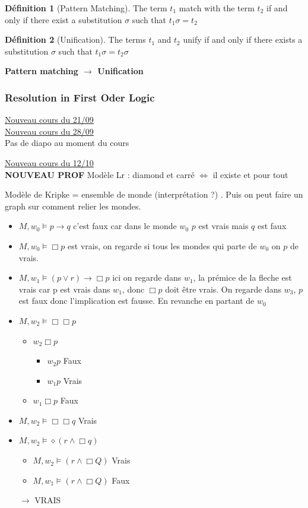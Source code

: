 \documentclass{article}
\theoremstyle{plain}%
\theoremstyle{definition}
\newtheorem{defn}{Définition}[section]
\theoremstyle{remark}
\begin{document}
\begin{defn}[Pattern Matching]
    The term $ t_1 $ match with the term $ t_2 $ if and only if there exist a substitution $ \sigma  $ such that $ t_1 \sigma = t_2 $ 
\end{defn}
\begin{defn}[Unification]
    The terms $ t_1 $ and $ t_2 $  unify if and only if there exists a substitution $ \sigma  $ such that $ t_1 \sigma = t_2 \sigma  $ 
\end{defn}
\textbf{Pattern matching $\rightarrow$ Unification}

\subsubsection{Resolution in First Oder Logic}

\underline{Nouveau cours du 21/09} \\
\underline{Nouveau cours du 28/09} \\
Pas de diapo au moment du cours

\underline{Nouveau cours du 12/10} \\
\textbf{NOUVEAU PROF}
Modèle Lr : diamond et carré $\Leftrightarrow$ il existe et pour tout 

Modèle de Kripke = ensemble de monde (interprétation ?) . Puis on peut faire un graph sur comment relier les mondes. \begin{itemize}
    \item $ M, w_0\models p \rightarrow q $ c'est faux car dans le monde $ w_0 $ $ p $ est vrais mais $ q $ est faux
    \item $ M, w_0\models \Box p $ est vrais, on regarde si tous les mondes qui parte de $ w_0 $ on $ p $ de vrais.
    \item $ M, w_1 \models (p \vee r) \rightarrow \Box p$ ici on regarde dans $ w_1 $, la prémice de la fleche est vrais car p est vrais dans $ w_1 $, donc $ \Box p $ doit être vrais. On regarde dans $ w_3 $, $ p $ est faux donc l'implication est fausse. En revanche en partant de $ w_0 $ 
    \item $ M, w_2 \models \Box \Box p $ \begin{itemize}
        \item $w_2 \Box p$ \begin{itemize}
            \item $ w_2 p  $ Faux
            \item $ w_1 p  $ Vrais
        \end{itemize}
        \item $w_1 \Box p$ Faux
    \end{itemize}
    \item $ M, w_2 \models \Box \Box q $ Vrais
    \item $ M, w_2 \models \diamond (r \wedge \Box q) $ \begin{itemize}
        \item $ M, w_2 \models (r \wedge \Box Q) $ Vrais 
        \item $ M, w_1 \models (r \wedge \Box Q) $ Faux 
    \end{itemize} $\rightarrow$ VRAIS
\end{itemize}
\end{document}
